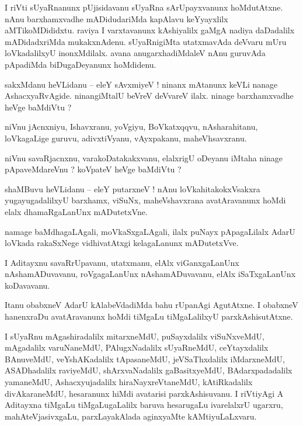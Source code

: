 \documentclass{article}
\begin{document}
\begin{mng}%
I riVti sUyaRnanunx pUjisidavanu sUyaRna sArUpayxvanunx hoMdutAtxne. nAnu barxhamxvadhe 
mADidudariMda kapAlavu keYyayxlilx aMTikoMDididxtu. raviya I varxtavanunx kAshiyalilx gaMgA 
nadiya daDadalilx mADidadxriMda mukakxnAdenu. sUyaRnigiMta utatxmavAda deVvaru mUru loVkadalilxyU 
inonxMdilalx. avana anugarxhadiMdaleV nAnu guruvAda pApadiMda biDugaDeyanunx hoMdidenu.
\end{mng}

\begin{mng}%
sakxMdanu heVLidanu -- eleY sAvxmiyeV ! ninanx mAtanunx keVLi nanage AshacxyaRvAgide. ninangiMtalU 
beVreV deVvareV ilalx. ninage barxhamxvadhe heVge baMdiVtu ?
\end{mng}

\begin{mng}%
niVnu jAcnxniyu, Ishavxranu, yoVgiyu, BoVkatxqqvu, nAsharahitanu, loVkagaLige guruvu, 
adivxtiVyanu, vAyxpakanu, maheVhsavxranu.
\end{mng}

\begin{mng}%
niVnu savaRjacnxnu, varakoDatakakxvanu, elalxrigU oDeyanu iMtaha ninage pApaveMdareVnu ? koVpateV 
heVge baMdiVtu ?
\end{mng}

\begin{mng}%
shaMBuvu heVLidanu -- eleY putarxneV ! nAnu loVkahitakokxVsakxra yugayugadalilxyU barxhamx, 
viSuNx, maheVshavxrana avatAravanunx hoMdi elalx dhamaRgaLanUnx mADutetxVne.
\end{mng}

\begin{mng}%
namage baMdhagaLAgali, moVkaSxgaLAgali, ilalx puNayx pApagaLilalx AdarU loVkada rakaSxNege 
vidhivatAtxgi kelagaLanunx mADutetxVve.
\end{mng}

\begin{mng}%
I Aditayxnu savaRrUpavanu, utatxmanu, elAlx viGanxgaLanUnx nAshamADuvavanu, roVgagaLanUnx 
nAshamADuvavanu, elAlx iSaTxgaLanUnx koDavavanu.
\end{mng}

\begin{mng}%
Itanu obabxneV AdarU kAlabeVdadiMda bahu rUpanAgi AgutAtxne. I obabxneV hanenxraDu avatAravanunx 
hoMdi tiMgaLu tiMgaLalilxyU parxkAshisutAtxne.
\end{mng}

\begin{mng}%
I sUyaRnu mAgashiradalilx mitarxneMdU, puSayxdalilx viSuNxveMdU, mAgadalilx varuNaneMdU, 
PAlugxNadalilx sUyaRneMdU, ceYtayxdalilx BAnuveMdU, veYshAKadalilx tApasaneMdU, jeVSaThxdalilx 
iMdarxneMdU, ASADhadalilx raviyeMdU, shArxvaNadalilx gaBasitxyeMdU, BAdarxpadadalilx yamaneMdU, 
Ashacxyujadalilx hiraNayxreVtaneMdU, kAtiRkadalilx divAkaraneMdU, hesaranunx hiMdi avatarisi 
parxkAshisuvanu. I riVtiyAgi A Aditayxna tiMgaLu tiMgaLugaLalilx baruva hesarugaLu ivarelalxrU 
ugarxru, mahAteVjasivxgaLu, parxLayakAlada aginxyaMte kAMtiyuLaLxvaru.
\end{mng}
\end{document}
